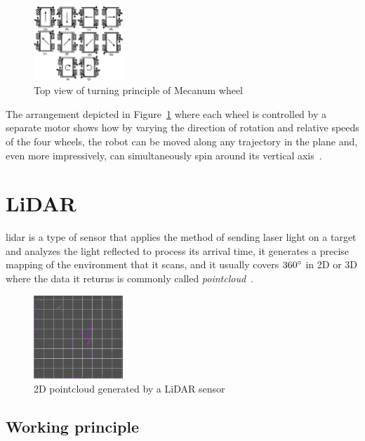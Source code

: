 \begin{figure}[H]
  \centering
  \includegraphics[width=0.3\textwidth]{imgs/mecanum_directions.png}
  \caption{Top view of turning principle of Mecanum wheel~\cite{Shao}}
  \label{fig:mecanum_direction}
\end{figure}

The arrangement depicted in Figure~\ref{fig:mecanum_direction} where each wheel is controlled by a separate motor shows how by varying the direction of rotation and relative speeds of the four wheels, the robot can be moved along any trajectory in the plane and, even more impressively, can simultaneously spin around its vertical axis~\cite{Siegwart2011}.

\section{LiDAR}\label{lidar}

\gls{lidar} is a type of sensor that applies the method of sending laser light on a target and analyzes the light reflected to process its arrival time, it generates a precise mapping of the environment that it scans, and it usually covers $360\degree$ in 2D or 3D where the data it returns is commonly called \emph{pointcloud}~\cite{mehendale2020review}.

\begin{figure}[H]
  \centering
  \includegraphics[width=0.3\textwidth]{imgs/pointcloud.png}
  \caption{2D pointcloud generated by a LiDAR sensor}
  \label{fig:pointcloud}
\end{figure}

\subsection{Working principle}

